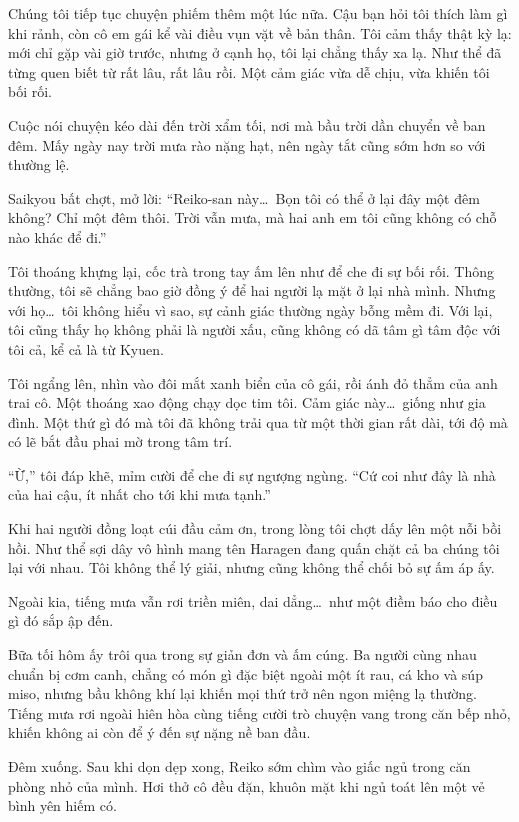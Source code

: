 \documentclass[../main.tex]{subfiles}
\begin{document}
Chúng tôi tiếp tục chuyện phiếm thêm một lúc nữa. Cậu bạn hỏi tôi thích làm gì khi rảnh, còn cô em gái kể vài điều vụn vặt về bản thân. Tôi cảm thấy thật kỳ lạ: mới chỉ gặp vài giờ trước, nhưng ở cạnh họ, tôi lại chẳng thấy xa lạ. Như thể đã từng quen biết từ rất lâu, rất lâu rồi. Một cảm giác vừa dễ chịu, vừa khiến tôi bối rối.

Cuộc nói chuyện kéo dài đến trời xẩm tối, nơi mà bầu trời dần chuyển về ban đêm. Mấy ngày nay trời mưa rào nặng hạt, nên ngày tắt cũng sớm hơn so với thường lệ.

Saikyou bất chợt, mở lời: ``Reiko-san này\dots\ Bọn tôi có thể ở lại đây một đêm không? Chỉ một đêm thôi. Trời vẫn mưa, mà hai anh em tôi cũng không có chỗ nào khác để đi.''

Tôi thoáng khựng lại, cốc trà trong tay ấm lên như để che đi sự bối rối. Thông thường, tôi sẽ chẳng bao giờ đồng ý để hai người lạ mặt ở lại nhà mình. Nhưng với họ\dots\ tôi không hiểu vì sao, sự cảnh giác thường ngày bỗng mềm đi. Với lại, tôi cũng thấy họ không phải là người xấu, cũng không có dã tâm gì tâm độc với tôi cả, kể cả là từ Kyuen.

Tôi ngẩng lên, nhìn vào đôi mắt xanh biển của cô gái, rồi ánh đỏ thẳm của anh trai cô. Một thoáng xao động chạy dọc tim tôi. Cảm giác này\dots\ giống như gia đình. Một thứ gì đó mà tôi đã không trải qua từ một thời gian rất dài, tới độ mà có lẽ bắt đầu phai mờ trong tâm trí.

``Ừ,'' tôi đáp khẽ, mỉm cười để che đi sự ngượng ngùng. ``Cứ coi như đây là nhà của hai cậu, ít nhất cho tới khi mưa tạnh.''

Khi hai người đồng loạt cúi đầu cảm ơn, trong lòng tôi chợt dấy lên một nỗi bồi hồi. Như thể sợi dây vô hình mang tên Haragen đang quấn chặt cả ba chúng tôi lại với nhau. Tôi không thể lý giải, nhưng cũng không thể chối bỏ sự ấm áp ấy.

Ngoài kia, tiếng mưa vẫn rơi triền miên, dai dẳng\dots\ như một điềm báo cho điều gì đó sắp ập đến.

\pov{-}

Bữa tối hôm ấy trôi qua trong sự giản đơn và ấm cúng. Ba người cùng nhau chuẩn bị cơm canh, chẳng có món gì đặc biệt ngoài một ít rau, cá kho và súp miso, nhưng bầu không khí lại khiến mọi thứ trở nên ngon miệng lạ thường. Tiếng mưa rơi ngoài hiên hòa cùng tiếng cười trò chuyện vang trong căn bếp nhỏ, khiến không ai còn để ý đến sự nặng nề ban đầu.

Đêm xuống. Sau khi dọn dẹp xong, Reiko sớm chìm vào giấc ngủ trong căn phòng nhỏ của mình. Hơi thở cô đều đặn, khuôn mặt khi ngủ toát lên một vẻ bình yên hiếm có.
\end{document}
